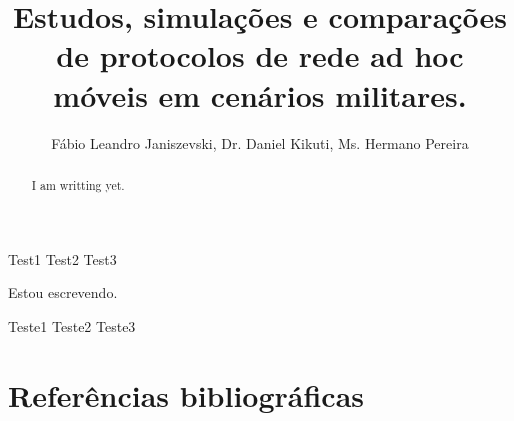 \documentclass[12pt]{article}
\title{Estudos, simula\c{c}\~oes e compara\c{c}\~oes de protocolos de rede ad hoc m\'oveis em cen\'arios militares.}
\author{
	F\'abio Leandro Janiszevski\inst{1}, 
	Dr. Daniel Kikuti\inst{1}, 
	Ms. Hermano Pereira\inst{2}
}
\begin{document}
\maketitle

\begin{abstract}
I am writting yet.
\end{abstract}

\begin{keyWord}
Test1 Test2 Test3
\end{keyWord}

\begin{resumo}
Estou escrevendo.
\end{resumo}

\begin{palavraChave}
Teste1 Teste2 Teste3
\end{palavraChave}



\section{Refer\^encias bibliogr\'aficas}


\end{document}
